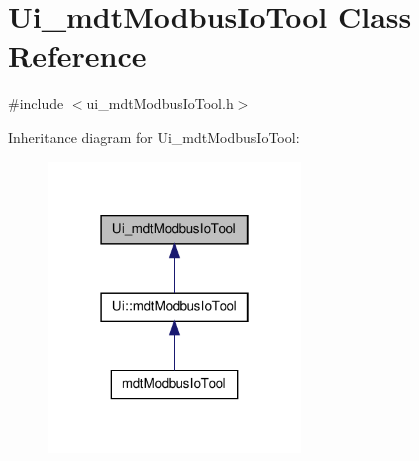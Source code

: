 \hypertarget{class_ui__mdt_modbus_io_tool}{\section{Ui\-\_\-mdt\-Modbus\-Io\-Tool Class Reference}
\label{class_ui__mdt_modbus_io_tool}
}


{\ttfamily \#include $<$ui\-\_\-mdt\-Modbus\-Io\-Tool.\-h$>$}



Inheritance diagram for Ui\-\_\-mdt\-Modbus\-Io\-Tool\-:\nopagebreak
\begin{figure}[H]
\begin{center}
\leavevmode
\includegraphics[width=190pt]{class_ui__mdt_modbus_io_tool__inherit__graph}
\end{center}
\end{figure}


